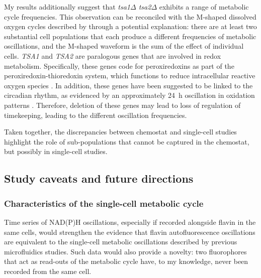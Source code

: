 My results additionally suggest that \textit{tsa1$\Delta$ tsa2$\Delta$} exhibits a range of metabolic cycle frequencies.
This observation can be reconciled with the M-shaped dissolved oxygen cycles described by \textcite{caustonMetabolicCyclesYeast2015} through a potential explanation: there are at least two substantial cell populations that each produce a different frequencies of metabolic oscillations, and the M-shaped waveform is the sum of the effect of individual cells.
\textit{TSA1} and \textit{TSA2} are paralogous genes that are involved in redox metabolism.
Specifically, these genes code for peroxiredoxins as part of the peroxiredoxin-thioredoxin system, which functions to reduce intracellular reactive oxygen species \parencite{wongCooperationYeastPeroxiredoxins2002}.
In addition, these genes have been suggested to be linked to the circadian rhythm, as evidenced by an approximately \SI{24}{\hour} oscillation in oxidation patterns \parencite{edgarPeroxiredoxinsAreConserved2012}.
Therefore, deletion of these genes may lead to loss of regulation of timekeeping, leading to the different oscillation frequencies.

Taken together, the discrepancies between chemostat and single-cell studies highlight the role of sub-populations that cannot be captured in the chemostat, but possibly in single-cell studies.


\subsection{Study caveats and future directions}
\label{subsec:biology-discussion-caveats}


\subsubsection{Characteristics of the single-cell metabolic cycle}
\label{subsec:biology-discussion-caveats-characteristics}

Time series of NAD(P)H oscillations, especially if recorded alongside flavin in the same cells, would strengthen the evidence that flavin autofluorescence oscillations are equivalent to the single-cell metabolic oscillations described by previous microfluidics studies.
Such data would also provide a novelty: two fluorophores that act as read-outs of the metabolic cycle have, to my knowledge, never been recorded from the same cell.


